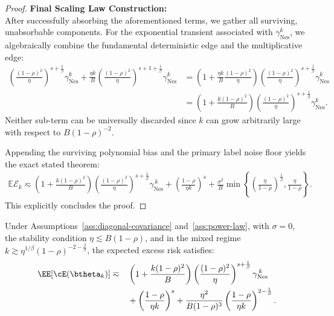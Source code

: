 \begin{proof}
\textbf{Final Scaling Law Construction:} \\
After successfully absorbing the aforementioned terms, we gather all surviving, unabsorbable components. 
For the exponential transient associated with $\gamma_{\mathrm{Nes}}^k$, we algebraically combine the fundamental deterministic edge and the multiplicative edge:
\begin{align*}
    \left(\frac{(1-\rho)^2}{\eta}\right)^{s+\frac{1}{\beta}} \gamma_{\mathrm{Nes}}^k + \frac{\eta k}{B} \left(\frac{(1-\rho)^2}{\eta}\right)^{s+1+\frac{1}{\beta}} \gamma_{\mathrm{Nes}}^k 
    &= \left( 1 + \frac{\eta k}{B} \frac{(1-\rho)^2}{\eta} \right) \left(\frac{(1-\rho)^2}{\eta}\right)^{s+\frac{1}{\beta}} \gamma_{\mathrm{Nes}}^k \\
    &= \left( 1 + \frac{k(1-\rho)^2}{B} \right) \left(\frac{(1-\rho)^2}{\eta}\right)^{s+\frac{1}{\beta}} \gamma_{\mathrm{Nes}}^k.
\end{align*}
Neither sub-term can be universally discarded since $k$ can grow arbitrarily large with respect to $B(1-\rho)^{-2}$.

Appending the surviving polynomial bias and the primary label noise floor yields the exact stated theorem:
\begin{align*}
    \mathbb{E}\mathcal E_k \eqsim \left( 1 + \frac{k(1-\rho)^2}{B} \right) \left(\frac{(1-\rho)^2}{\eta}\right)^{s+\frac{1}{\beta}} \gamma_{\mathrm{Nes}}^{\,k} + \left(\frac{1-\rho}{\eta k}\right)^s + \frac{\sigma^2}{B} \min\left\{ \left(\frac{\eta}{1-\rho}\right)^{\frac1\beta}, \frac{\eta}{1-\rho} \right\}.
\end{align*}
This explicitly concludes the proof.
\end{proof}

\begin{theorem}
\label{thm:nes_two_sided_scaling_noiseless}
Under Assumptions~\ref{ass:diagonal-covariance} and~\ref{ass:power-law}, with \(\sigma=0\), the stability condition \(\eta \lesssim B(1-\rho)\), and in the mixed regime \(k \gtrsim \eta^{1/\beta}(1-\rho)^{-2-\frac{2}{\beta}}\), the expected excess risk satisfies:
\begin{equation}
\label{eq:nes_two_sided_scaling_noiseless}
\begin{aligned}
    \EE[\cE(\btheta_k)]
    \eqsim\quad
    &\left(
        1+\frac{k(1-\rho)^2}{B}
    \right)
    \left(\frac{(1-\rho)^2}{\eta}\right)^{s+\frac1\beta}
    \gamma_{\mathrm{Nes}}^{\,k} \\
    &+
    \left(\frac{1-\rho}{\eta k}\right)^s
    +
    \frac{\eta^2}{B(1-\rho)^3}
    \left(\frac{1-\rho}{\eta k}\right)^{2-\frac1\beta}.
\end{aligned}
\end{equation}
\end{theorem}

